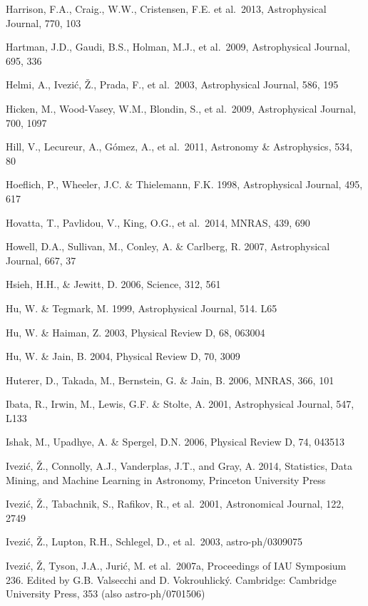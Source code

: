 \documentclass{emulateapj}
\begin{document}
\begin{thebibliography}{}
\bibitem[()]{} Harrison, F.A., Craig., W.W., Cristensen, F.E. et
  al.~2013, Astrophysical Journal, 770, 103

\bibitem[()]{} Hartman, J.D., Gaudi, B.S., Holman, M.J., et al.~2009, Astrophysical Journal, 695, 336

\bibitem[()]{} Helmi, A., Ivezi\'{c}, \v{Z}., Prada, F., et al.~2003, Astrophysical Journal, 586, 195

\bibitem[()]{} Hicken, M., Wood-Vasey, W.M., Blondin, S., et al.~2009, Astrophysical Journal, 700, 1097

\bibitem[()]{} Hill, V., Lecureur, A., G{\'o}mez, A., et al.~2011, Astronomy \& Astrophysics, 534, 80 

\bibitem[()]{} Hoeflich, P., Wheeler, J.C. \& Thielemann, F.K. 1998, Astrophysical Journal, 495, 617

\bibitem[()]{} Hovatta, T., Pavlidou, V., King, O.G., et al.~2014, MNRAS, 439, 690	 

\bibitem[()]{} Howell, D.A., Sullivan, M., Conley, A. \& Carlberg, R. 2007, Astrophysical Journal, 667, 37

\bibitem[()]{} Hsieh, H.H., \& Jewitt, D. 2006, Science, 312, 561

\bibitem[()]{} Hu, W. \& Tegmark, M. 1999, Astrophysical Journal, 514. L65

\bibitem[()]{} Hu, W. \& Haiman, Z. 2003, Physical Review D, 68, 063004

\bibitem[()]{} Hu, W. \& Jain, B. 2004, Physical Review D, 70, 3009

\bibitem[()]{} Huterer, D., Takada, M., Bernstein, G. \& Jain, B. 2006, MNRAS, 366, 101
	
\bibitem[()]{} Ibata, R., Irwin, M., Lewis, G.F. \& Stolte, A. 2001, Astrophysical Journal, 547, L133
	
\bibitem[()]{} Ishak, M., Upadhye, A. \& Spergel, D.N. 2006, Physical Review D, 74, 043513

\bibitem[()]{} Ivezi\'c, \v Z., Connolly, A.J., Vanderplas, J.T., and
  Gray, A. 2014, Statistics, Data Mining, and Machine Learning in
  Astronomy, Princeton University Press

\bibitem[()]{} Ivezi\'{c}, \v{Z}., Tabachnik, S., Rafikov, R., et al.~2001, Astronomical Journal, 122, 2749
	
\bibitem[()]{} Ivezi\'c, \v Z., Lupton, R.H., Schlegel, D., et al.~2003, astro-ph/0309075

\bibitem[()]{} Ivezi\'{c}, \v{Z}, Tyson, J.A., Juri\'{c}, M. et al.~2007a, Proceedings of IAU Symposium 
             236. Edited by G.B. Valsecchi and D. Vokrouhlick\'{y}. Cambridge: Cambridge University 
             Press, 353 (also astro-ph/0701506)


\end{thebibliography}
\end{document}
